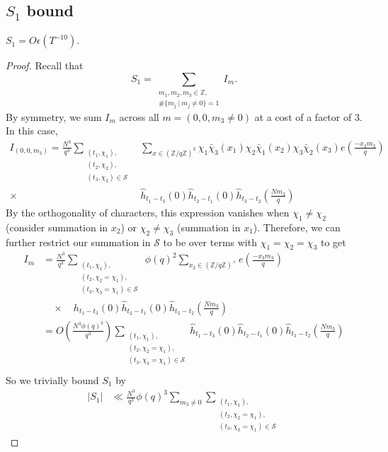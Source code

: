 \subsection{$S_1$ bound}
\begin{proposition}\label{s1bound}
    $S_1=O\epsilon(T^{-10})$.
\end{proposition}
\begin{proof}
    Recall that \[
    S_1=\sum_{\substack{m_1,m_2,m_3\in \mathbb{Z},\\
    \#\{m_j \ | \ m_j\neq 0\}=1}} I_m.\]
By symmetry, we sum $I_m$ across all $m=(0,0,m_3\neq 0)$ at a cost of a factor of $3$.
In this case, \begin{align*}
    I_{(0,0,m_3)}=\frac{N^3}{q^3}\sum_{\substack{(t_1,\chi_1),\\(t_2,\chi_2),\\(t_3,\chi_3)\in\mathcal{S}}} &\sum_{x\in (\mathbb{Z}/q\mathbb{Z})^3}\chi_1\bar{\chi}_3(x_1)\chi_2\bar{\chi}_1(x_2)\chi_3\bar{\chi}_2(x_3) e\left(\frac{-x_3 m_3}{q}\right)\\
    \times \ &\hat{h}_{t_1-t_3}\left(0\right)\hat{h}_{t_2-t_1}\left(0\right)\hat{h}_{t_3-t_2}\left(\frac{Nm_3}{q}\right)
\end{align*}
By the orthogonality of characters, this expression vanishes when $\chi_1\neq \chi_2$ (consider summation in $x_2$) or $\chi_2\neq \chi_3$ (summation in $x_1$). Therefore, we can further restrict our summation in $\mathcal{S}$ to be over terms with $\chi_1=\chi_2=\chi_3$ to get \begin{align*}
    I_m&=\frac{N^3}{q^3}\sum_{\substack{(t_1,\chi_1),\\(t_2,\chi_2=\chi_1),\\(t_3,\chi_3=\chi_1)\in\mathcal{S}}} \ \phi(q)^2 \sum_{x_3\in (\mathbb{Z}/q\mathbb{Z})^{\times}}e\left(\frac{-x_3 m_3}{q}\right)\\
   & \quad  \times  \quad {h}_{t_1-t_3}\left(0\right)\hat{h}_{t_2-t_1}\left(0\right)\hat{h}_{t_3-t_2}\left(\frac{Nm_3}{q}\right)\\
   &=O\left(\frac{N^3\phi(q)^3}{q^3}\right) \sum_{\substack{(t_1,\chi_1),\\(t_2,\chi_2=\chi_1),\\(t_3,\chi_3=\chi_1)\in\mathcal{S}}} \hat{h}_{t_1-t_3}\left(0\right)\hat{h}_{t_2-t_1}\left(0\right)\hat{h}_{t_3-t_2}\left(\frac{Nm_3}{q}\right)\\
\end{align*}
So we trivially bound $S_1$ by\begin{align*}
    |S_1|&\ll  \frac{N^3}{q^3} \phi(q)^3 \sum_{m_3\neq 0}\sum_{\substack{(t_1,\chi_1),\\(t_2,\chi_2=\chi_1),\\(t_3,\chi_3=\chi_1)\in\mathcal{S}}}

\end{align*}
\end{proof}
